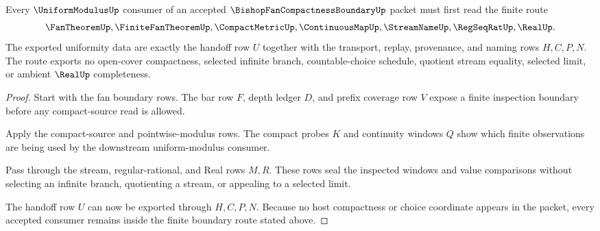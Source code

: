 \begin{theorem}
\label{thm:bishop-fan-compactness-boundary-handoff}
Every $\UniformModulusUp$ consumer of an accepted $\BishopFanCompactnessBoundaryUp$ packet must first read the finite route
$$
\FanTheoremUp,\FiniteFanTheoremUp,\CompactMetricUp,\ContinuousMapUp,\StreamNameUp,\RegSeqRatUp,\RealUp .
$$
The exported uniformity data are exactly the handoff row $U$ together with the transport, replay, provenance, and naming rows $H,C,P,N$. The route exports no open-cover compactness, selected infinite branch, countable-choice schedule, quotient stream equality, selected limit, or ambient $\RealUp$ completeness.
\end{theorem}
\begin{proof}
Start with the fan boundary rows. The bar row $F$, depth ledger $D$, and prefix coverage row $V$ expose a finite inspection boundary before any compact-source read is allowed.

Apply the compact-source and pointwise-modulus rows. The compact probes $K$ and continuity windows $Q$ show which finite observations are being used by the downstream uniform-modulus consumer.

Pass through the stream, regular-rational, and Real rows $M,R$. These rows seal the inspected windows and value comparisons without selecting an infinite branch, quotienting a stream, or appealing to a selected limit.

The handoff row $U$ can now be exported through $H,C,P,N$. Because no host compactness or choice coordinate appears in the packet, every accepted consumer remains inside the finite boundary route stated above.
\end{proof}



